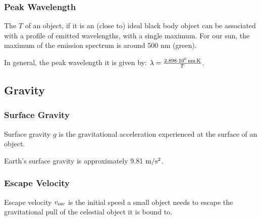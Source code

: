 \documentclass[letterpaper,10pt,english]{sphinxmanual}
\begin{document}
\subsubsection{Peak Wavelength}
\label{\detokenize{quantities/surface/emission/peak_wavelength:peak-wavelength}}\label{\detokenize{quantities/surface/emission/peak_wavelength::doc}}\label{\detokenize{quantities/surface/emission/peak_wavelength:id1}}
\sphinxAtStartPar
The {\hyperref[\detokenize{quantities/surface/emission/temperature:id1}]{}} \(T\) of an object,
if it is an (close to) ideal black body object can be associated with
a profile of emitted wavelengths, with a single maximum.
For our sun, the maximum of the emission spectrum is around 500 nm (green).

\sphinxAtStartPar
In general, the peak wavelength it is given by: \(\lambda = \frac{2.898 \cdot 10 ^ 6 \,{\rm nm\, K}}{T}\).


\subsection{Gravity}
\label{\detokenize{quantities/surface/gravity/gravity:gravity}}\label{\detokenize{quantities/surface/gravity/gravity::doc}}\label{\detokenize{quantities/surface/gravity/gravity:id1}}

\subsubsection{Surface Gravity}
\label{\detokenize{quantities/surface/gravity/surface_gravity:surface-gravity}}\label{\detokenize{quantities/surface/gravity/surface_gravity::doc}}\label{\detokenize{quantities/surface/gravity/surface_gravity:id1}}
\sphinxAtStartPar
Surface gravity \(g\) is the gravitational acceleration experienced at
the surface of an object.

\sphinxAtStartPar
Earth’s surface gravity is approximately 9.81 \({\rm m/s^2}\).


\subsubsection{Escape Velocity}
\label{\detokenize{quantities/surface/gravity/escape_velocity:escape-velocity}}\label{\detokenize{quantities/surface/gravity/escape_velocity::doc}}\label{\detokenize{quantities/surface/gravity/escape_velocity:id1}}
\sphinxAtStartPar
Escape velocity \(v_{\rm esc}\) is the initial speed a small object needs to escape the gravitational
pull of the celestial object it is bound to.
\end{document}
